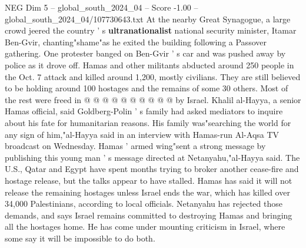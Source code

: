 \begin{textsample}{NEG Dim 5 – global\_south\_2024\_04 – Score -1.00 – global\_south\_2024\_04/107730643.txt}
At the nearby Great Synagogue, a large crowd jeered the country ' s \textbf{ultranationalist} national security minister, Itamar Ben-Gvir, chanting"shame"as he exited the building following a Passover gathering.
One protester banged on Ben-Gvir ' s car and was pushed away by police as it drove off.
Hamas and other militants abducted around 250 people in the Oct. 7 attack and killed around 1,200, mostly civilians.
They are still believed to be holding around 100 hostages and the remains of some 30 others.
Most of the rest were freed in @ @ @ @ @ @ @ @ @ @ by Israel.
Khalil al-Hayya, a senior Hamas official, said Goldberg-Polin ' s family had asked mediators to inquire about his fate for humanitarian reasons.
His family was"searching the world for any sign of him,"al-Hayya said in an interview with Hamas-run Al-Aqsa TV broadcast on Wednesday.
Hamas ' armed wing"sent a strong message by publishing this young man ' s message directed at Netanyahu,"al-Hayya said.
The U.S., Qatar and Egypt have spent months trying to broker another cease-fire and hostage release, but the talks appear to have stalled.
Hamas has said it will not release the remaining hostages unless Israel ends the war, which has killed over 34,000 Palestinians, according to local officials.
Netanyahu has rejected those demands, and says Israel remains committed to destroying Hamas and bringing all the hostages home.
He has come under mounting criticism in Israel, where some say it will be impossible to do both.

\end{textsample}
